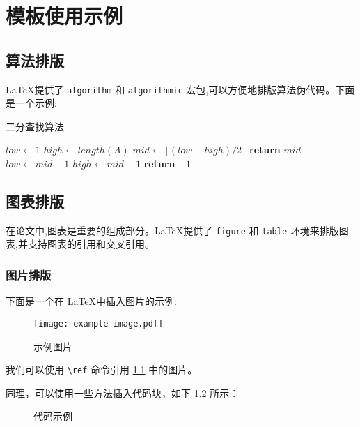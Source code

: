 \chapter{模板使用示例}

\section{算法排版}
\LaTeX 提供了 \verb|algorithm| 和 \verb|algorithmic| 宏包,可以方便地排版算法伪代码。下面是一个示例:

\begin{algorithm}
\caption{二分查找算法}
\label{alg:binary_search}
\begin{algorithmic}[1]
\State $low \gets 1$
\State $high \gets length(A)$
\State $mid \gets \lfloor (low + high) / 2 \rfloor$
\State \textbf{return} $mid$
\State $low \gets mid + 1$
\Else
\State $high \gets mid - 1$
\EndIf
\EndWhile
\State \textbf{return} $-1$
\EndProcedure
\end{algorithmic}
\end{algorithm}

\section{图表排版}
在论文中,图表是重要的组成部分。\LaTeX 提供了 \verb|figure| 和 \verb|table| 环境来排版图表,并支持图表的引用和交叉引用。

\subsection{图片排版}
下面是一个在 \LaTeX 中插入图片的示例:

\begin{figure}[htbp]
\centering
\texttt{[image: example-image.pdf]}
\caption{示例图片}
\label{fig:example_image}
\end{figure}

我们可以使用 \verb|\ref| 命令引用 \ref{fig:example_image} 中的图片。

同理，可以使用一些方法插入代码块，如下 \ref{fig:example_code_block} 所示：

\begin{figure}[!htb]
    \centerline{}
    \caption{代码示例}
    \label{fig:example_code_block}
\end{figure}


